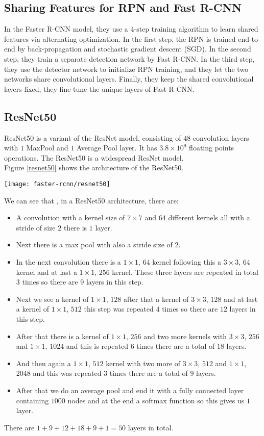 \subsection{Sharing Features for RPN and Fast R-CNN}
In the Faster R-CNN model, they use a 4-step training algorithm to learn shared features via alternating optimization. In the first step, the RPN is trained end-to-end by back-propagation and stochastic gradient descent (SGD). In the second step, they train a separate detection network by Fast R-CNN. In the third step, they use the detector network to initialize RPN training, and they let the two networks share convolutional layers. Finally, they keep the shared convolutional layers fixed, they fine-tune the unique layers of Fast R-CNN.

\subsection{ResNet50}
ResNet50 is a variant of the ResNet model, consisting of $48$ convolution layers with $1$ MaxPool and $1$ Average Pool layer. It has $3.8 \times 10^9$ floating points operations. The ResNet50 is a widespread ResNet model. \\
Figure \ref{resnet50} shows the architecture of the ResNet50.
\begin{strip} %
\texttt{[image: faster-rcnn/resnet50]}
\label{resnet50}
\end{strip}
We can see that \cite{resnet-50}, in a ResNet50 architecture, there are:
\begin{itemize}
\item A convolution with a kernel size of $7 \times 7$ and $64$ different kernels all with a stride of size $2$ there is $1$ layer.
\item Next there is a max pool with also a stride size of 2.
\item In the next convolution there is a $1 \times 1$, $64$ kernel following this a $3 \times 3$, $64$ kernel and at last a $1 \times 1$, $256$ kernel. These three layers are repeated in total $3$ times so there are $9$ layers in this step.
\item Next we see a kernel of $1 \times 1$, $128$ after that a kernel of $3 \times 3$, $128$ and at last a kernel of $1 \times 1$, $512$ this step was repeated $4$ times so there are $12$ layers in this step.
\item After that there is a kernel of $1 \times 1$, $256$ and two more kernels with $3 \times 3$, $256$ and $1 \times 1$, $1024$ and this is repeated $6$ times there are a total of $18$ layers.
\item And then again a $1 \times 1$, $512$ kernel with two more of $3 \times 3$, $512$ and $1 \times 1$, $2048$ and this was repeated $3$ times there are a total of $9$ layers.
\item After that we do an average pool and end it with a fully connected layer containing $1000$ nodes and at the end a softmax function so this gives us $1$ layer.
\end{itemize}
There are $1 + 9 + 12 + 18 + 9 + 1 = 50$ layers in total.
